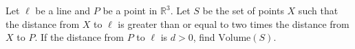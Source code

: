 Let $\ell$ be a line and $P$ be a point in $\mathbb{R}^3$. Let $S$ be the set of points $X$ such that the distance from $X$ to $\ell$ is greater than or equal to two times the distance from $X$ to $P$. If the distance from $P$ to $\ell$ is $d>0$, find $\text{Volume}(S)$.